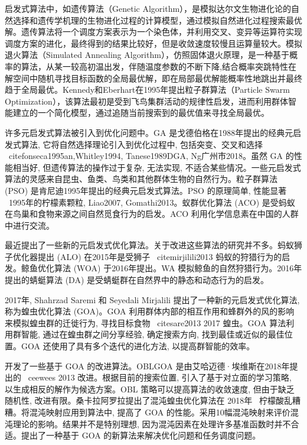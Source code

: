 启发式算法中，如遗传算法（Genetic Algorithm），是模拟达尔文生物进化论的自然选择和遗传学机理的生物进化过程的计算模型，通过模拟自然进化过程搜索最优解。遗传算法将一个调度方案表示为一个染色体，并利用交叉、变异等运算符实现调度方案的进化，最终得到的结果比较好，但是收敛速度较慢且运算量较大。模拟退火算法（Simulated Annealing Algorithm），仿照固体退火原理，是一种基于概率的算法，从某一较高初温出发，伴随温度参数的不断下降,结合概率突跳特性在解空间中随机寻找目标函数的全局最优解，即在局部最优解能概率性地跳出并最终趋于全局最优。Kennedy和Eberhart在1995年提出粒子群算法（Particle Swarm Optimization），该算法最初是受到飞鸟集群活动的规律性启发，进而利用群体智能建立的一个简化模型，通过追随当前搜索到的最优值来寻找全局最优。

许多元启发式算法被引入到优化问题中。GA 是戈德伯格在1988年提出的经典元启发式算法, 它将自然选择理论引入到优化过程中, 包括突变、交叉和选择 \ citefonseca1995an,Whitley1994, Tanese1989DGA, Ng广州市2018。虽然 GA 的性能相当好, 但遗传算法的操作过于复杂, 无法实现, 不适合某些情况。一些元启发式算法的灵感来自昆虫、鱼类、鸟类和其他群体生物的自然行为。粒子群算法 (PSO) 是肯尼迪1995年提出的经典元启发式算法。PSO 的原理简单, 性能显著 \ 1995年的柠檬素颗粒, Liao2007, Gomathi2013。蚁群优化算法 (ACO) 是受蚂蚁在鸟巢和食物来源之间自然觅食行为的启发。ACO 利用化学信息素在中国的人群中进行交流。

最近提出了一些新的元启发式优化算法。关于改进这些算法的研究并不多。蚂蚁狮子优化器提出 (ALO) 在2015年是受狮子 \ citemirjilili2013 蚂蚁的狩猎行为的启发。鲸鱼优化算法 (WOA) 于2016年提出。WA 模拟鲸鱼的自然狩猎行为。2016年提出的蜻蜓算法 (DA) 是受蜻蜓群在自然界中的静态和动态行为的启发。


2017年, Shahrzad Saremi 和 Seyedali Mirjalili 提出了一种新的元启发式优化算法, 称为蝗虫优化算法 (GOA)。GOA 利用群体内部的相互作用和蜂群外的风的影响来模拟蝗虫群的迁徙行为, 寻找目标食物 \ citesare2013 2017 蝗虫。GOA 算法利用群智能, 通过在蝗虫群之间分享经验, 确定搜索方向, 找到最佳或近似的最佳位置。GOA 还使用了具有多个迭代的进化方法, 以提高群智能的效率。

开发了一些基于 GOA 的改进算法。OBLGOA 是由艾哈迈德·埃维斯在2018年提出的 \ ceewees 2013 改进。根据目前的搜索位置, 引入了基于对立面的学习策略, 以生成相反的解作为候选方案。OBL 策略可以提高算法的收敛速度, 但由于缺乏随机性, 改进有限。桑卡拉阿罗拉提出了混沌蝗虫优化算法在 2018年 \ 柠檬酸乱糟糟。将混沌映射应用到算法中, 提高了 GOA 的性能。采用10幅混沌映射来评价混沌理论的影响。结果并不是特别理想, 因为混沌因素在处理许多基准函数时并不合适。提出了一种基于 GOA 的新算法来解决优化问题和任务调度问题。

